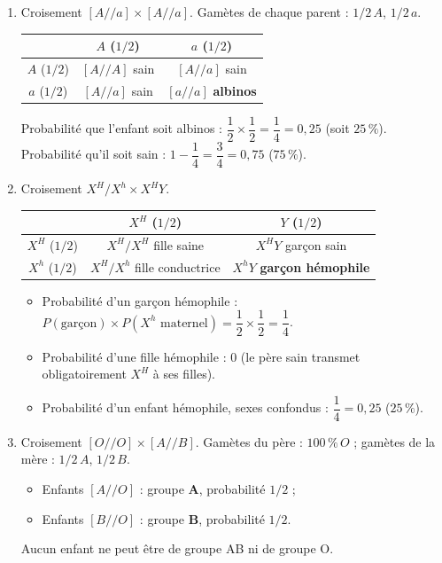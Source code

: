 \documentclass[11pt]{article}
\begin{document}
\begin{corrige}
\begin{enumerate}
\item Croisement $[A//a] \times [A//a]$. Gamètes de chaque parent : $1/2\,A$, $1/2\,a$.
\begin{center}
\begin{tabular}{|c|c|c|}\hline
\rowcolor{popblueL} & $A$ ($1/2$) & $a$ ($1/2$) \\ \hline
$A$ ($1/2$) & $[A//A]$ sain & $[A//a]$ sain \\ \hline
$a$ ($1/2$) & $[A//a]$ sain & $[a//a]$ \textbf{albinos} \\ \hline
\end{tabular}
\end{center}
Probabilité que l'enfant soit albinos : $\dfrac{1}{2}\times\dfrac{1}{2}=\dfrac{1}{4}=0,25$ (soit $25\,\%$). Probabilité qu'il soit sain : $1-\dfrac{1}{4}=\dfrac{3}{4}=0,75$ ($75\,\%$).
\item Croisement $X^{H}/X^{h} \times X^{H}Y$.
\begin{center}
\begin{tabular}{|c|c|c|}\hline
\rowcolor{popblueL} & $X^{H}$ ($1/2$) & $Y$ ($1/2$) \\ \hline
$X^{H}$ ($1/2$) & $X^{H}/X^{H}$ fille saine & $X^{H}Y$ garçon sain \\ \hline
$X^{h}$ ($1/2$) & $X^{H}/X^{h}$ fille conductrice & $X^{h}Y$ \textbf{garçon hémophile} \\ \hline
\end{tabular}
\end{center}
\begin{itemize}
\item Probabilité d'un garçon hémophile : $P(\text{garçon})\times P(X^{h}\text{ maternel})=\dfrac{1}{2}\times\dfrac{1}{2}=\dfrac{1}{4}$.
\item Probabilité d'une fille hémophile : $0$ (le père sain transmet obligatoirement $X^{H}$ à ses filles).
\item Probabilité d'un enfant hémophile, sexes confondus : $\dfrac{1}{4}=0,25$ ($25\,\%$).
\end{itemize}
\item Croisement $[O//O] \times [A//B]$. Gamètes du père : $100\,\%\,O$ ; gamètes de la mère : $1/2\,A$, $1/2\,B$.
\begin{itemize}
\item Enfants $[A//O]$ : groupe \textbf{A}, probabilité $1/2$ ;
\item Enfants $[B//O]$ : groupe \textbf{B}, probabilité $1/2$.
\end{itemize}
Aucun enfant ne peut être de groupe AB ni de groupe O.
\end{enumerate}
\end{corrige}
\end{document}
